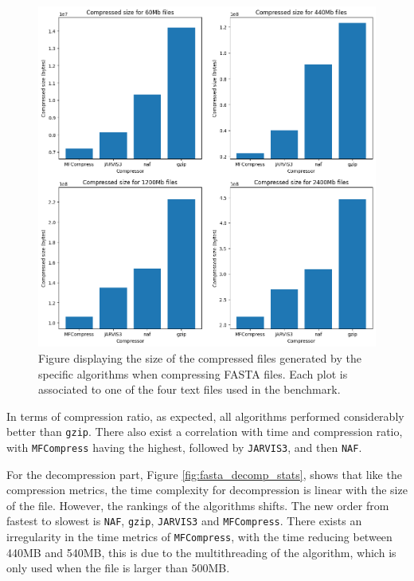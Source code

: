     \begin{figure}
        \centering
        \includegraphics[width=1\textwidth]{figs/fasta_comp_size.png}
        \caption[Figure displaying the size of the compressed files generated by the specific algorithms when compressing FASTA files.] {Figure displaying the size of the compressed files generated by the specific algorithms when compressing FASTA files. Each plot is associated to one of the four text files used in the benchmark.}
        \label{fig:fasta_comp_size}
    \end{figure}

    
    In terms of compression ratio, as expected, all algorithms performed considerably better than \texttt{gzip}. There also exist a correlation with time and compression ratio, with \texttt{MFCompress} having the highest, followed by \texttt{JARVIS3}, and then \texttt{NAF}.

    For the decompression part, Figure \ref{fig:fasta_decomp_stats}, shows that like the compression metrics, the time complexity for decompression is linear with the size of the file. However, the rankings of the algorithms shifts. The new order from fastest to slowest is \texttt{NAF}, \texttt{gzip}, \texttt{JARVIS3} and \texttt{MFCompress}. There exists an irregularity in the time metrics of \texttt{MFCompress}, with the time reducing between 440MB and 540MB, this is due to the multithreading of the algorithm, which is only used when the file is larger than 500MB. 

